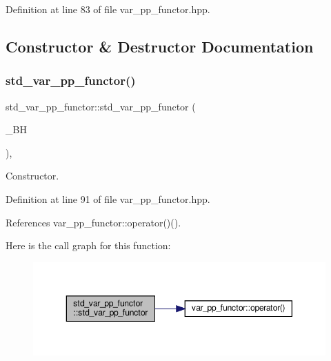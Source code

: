 Definition at line 83 of file var\+\_\+pp\+\_\+functor.\+hpp.



\subsection{Constructor \& Destructor Documentation}
\mbox{\label{structstd__var__pp__functor_a5e79f2419dd19f1ce0fb5e425093d4bf}} 
\subsubsection{\texorpdfstring{std\+\_\+var\+\_\+pp\+\_\+functor()}{std\_var\_pp\_functor()}}
{\footnotesize\ttfamily std\+\_\+var\+\_\+pp\+\_\+functor\+::std\+\_\+var\+\_\+pp\+\_\+functor (\begin{DoxyParamCaption}\item[{const \hyperlink{behavioral__helper_8hpp_aae973b54cac87eef3b27442aa3e1e425}{Behavioral\+Helper\+Const\+Ref}}]{\+\_\+\+BH }\end{DoxyParamCaption})\hspace{0.3cm}{\ttfamily [inline]}, {\ttfamily [explicit]}}



Constructor. 



Definition at line 91 of file var\+\_\+pp\+\_\+functor.\+hpp.



References var\+\_\+pp\+\_\+functor\+::operator()().

Here is the call graph for this function\+:
\nopagebreak
\begin{figure}[H]
\begin{center}
\leavevmode
\includegraphics[width=350pt]{d4/d4a/structstd__var__pp__functor_a5e79f2419dd19f1ce0fb5e425093d4bf_cgraph}
\end{center}
\end{figure}
\mbox{\label{structstd__var__pp__functor_a0755528d3c7000f6c7558d89a0c596b7}} 

